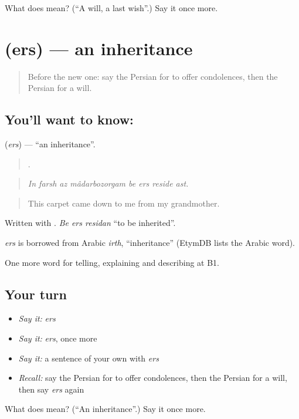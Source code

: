\begin{tcolorbox}[breakable,colback=teal!4,colframe=teal!35!black,title={Before you move on}]
What does  mean? (\textquotedblleft{}A will, a last wish\textquotedblright{}.) Say it once more.
\end{tcolorbox}
\section[\texorpdfstring{\fa{ارث} (ers)}{ارث (ers)}]{ (ers) — an inheritance}

\label{lesson:FA-C338-ers}



\begin{quote}
Before the new one: say the Persian for to offer condolences, then the Persian for a will.
\end{quote}

\subsection*{You'll want to know: }
\textbf{} (\emph{ers}) — \textquotedblleft{}an inheritance\textquotedblright{}.

\begin{quote}
       .
\end{quote}

\begin{quote}
\emph{In farsh az mâdarbozorgam be ers reside ast.}
\end{quote}

\begin{quote}
This carpet came down to me from my grandmother.
\end{quote}

Written with . \emph{Be ers residan} \textquotedblleft{}to be inherited\textquotedblright{}.

\begin{cousinweb}
\emph{ers} is borrowed from Arabic \emph{irth}, \textquotedblleft{}inheritance\textquotedblright{} (EtymDB lists the Arabic word).
\end{cousinweb}

\begin{grammarlens}[title={What you've built}]
One more word for telling, explaining and describing at B1.
\end{grammarlens}

\subsection*{Your turn}
\begin{itemize}
\raggedright
  \item \emph{Say it:} \emph{ers}
  \item \emph{Say it:} \emph{ers}, once more
  \item \emph{Say it:} a sentence of your own with \emph{ers}
  \item \emph{Recall:} say the Persian for to offer condolences, then the Persian for a will, then say \emph{ers} again
\end{itemize}

\begin{tcolorbox}[breakable,colback=teal!4,colframe=teal!35!black,title={Before you move on}]
What does  mean? (\textquotedblleft{}An inheritance\textquotedblright{}.) Say it once more.
\end{tcolorbox}
